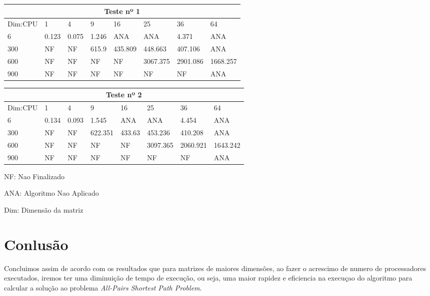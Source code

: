 \documentclass[12pt,a4paper]{article}
\begin{document}
                
                \begin{tabular}{ |p{1.6cm}||p{1.5cm}|p{1.5cm}|p{1.5cm}|p{1.5cm}|p{1.5cm}|p{1.5cm}|p{1.5cm}| }
                 \hline
                 \multicolumn{8}{|c|}{Teste nº 1} \\
                    \hline
                    Dim:CPU & 1 & 4 & 9 & 16 & 25 & 36 & 64\\
                     \hline
                     6   & 0.123 & 0.075 & 1.246 & ANA & ANA & 4.371 & ANA\\
                     300 & NF & NF & 615.9 & 435.809 & 448.663 & 407.106 & ANA\\
                     600 & NF & NF & NF & NF & 3067.375 & 2901.086 & 1668.257\\
                     900 & NF & NF & NF & NF & NF & NF & ANA\\
                 
                 \hline
                \end{tabular}
                \break
                
                
                \begin{tabular}{ |p{1.6cm}||p{1.5cm}|p{1.5cm}|p{1.5cm}|p{1.5cm}|p{1.5cm}|p{1.5cm}|p{1.5cm}| }
                 \hline
                 \multicolumn{8}{|c|}{Teste nº 2} \\
                    \hline
                    Dim:CPU & 1 & 4 & 9 & 16 & 25 & 36 & 64\\
                     \hline
                     6   & 0.134 & 0.093 & 1.545 & ANA & ANA & 4.454 & ANA\\
                     300 & NF & NF & 622.351 & 433.63 & 453.236 & 410.208 & ANA\\
                     600 & NF & NF & NF & NF & 3097.365 & 2060.921 & 1643.242\\
                     900 & NF & NF & NF & NF & NF & NF & ANA\\
                 
                 \hline
                \end{tabular}
                \break
                
                NF: Nao Finalizado
                
                ANA: Algoritmo Nao Aplicado
                
                Dim: Dimensão da matriz
                
                \section{Conlusão}
                    Concluimos assim de acordo com os resultados que para matrizes de maiores dimensões, ao fazer o acrescimo de numero de processadores executados, iremos ter uma diminuição de tempo de execução, ou seja, uma maior rapidez e eficiencia na execuçao do algoritmo para calcular a solução ao problema \textit{All-Pairs Shortest Path Problem}.
                    
                    
            
                   
                
            
            
            
\end{document}

